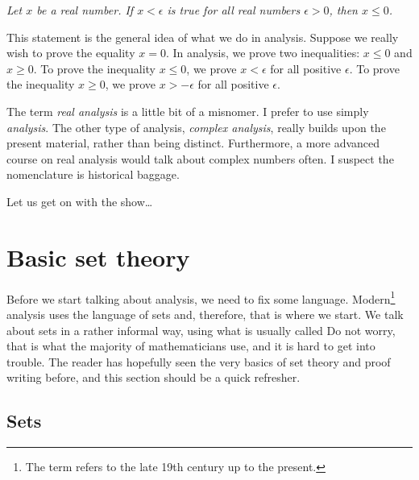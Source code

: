\emph{Let $x$ be a real number.  If $x < \epsilon$ is true for all
real numbers
$\epsilon > 0$, then $x \leq 0$.}

\medskip

This statement is the general idea of what we do in analysis.
Suppose we really wish to prove the equality
$x = 0$.  In analysis, we prove two inequalities:
$x \leq 0$ and $x \geq 0$.
To
prove the inequality
$x \leq 0$, we prove 
$x < \epsilon$ for all positive $\epsilon$.
To
prove the inequality
$x \geq 0$, we prove 
$x > -\epsilon$ for all positive $\epsilon$.

\medskip

The term \emph{real analysis} is a little bit of a misnomer.  I prefer to
use simply \emph{analysis}.  The other type of analysis, 
\emph{complex analysis}, really builds upon the present material, rather than
being distinct.  Furthermore, a more advanced course on real
analysis would talk about complex numbers often.
I suspect the nomenclature is
historical baggage.

\medskip

Let us get on with the show\ldots



\sectionnewpage
\section{Basic set theory} \label{sec:basicset}



Before we start talking about analysis, we need to fix some language.
Modern\footnote{The term  refers to the late 19th century up to
the present.}
analysis uses the language of sets and, therefore, that is where we start.
We talk about sets in a rather informal way, using what is usually called
  Do not worry, that is what the majority of
mathematicians use, and it is hard to get into trouble.
The reader has hopefully seen the very basics of set theory
and proof writing before, and this section should be a quick refresher.

\subsection{Sets}

